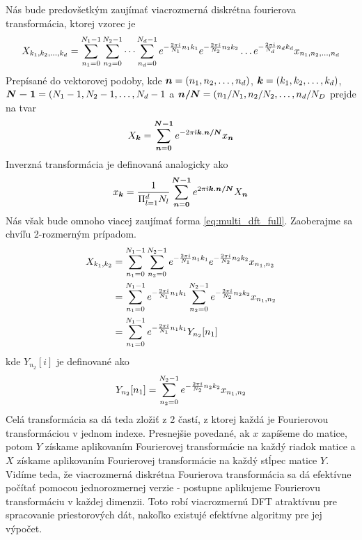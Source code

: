 Nás bude predovšetkým zaujímať viacrozmerná diskrétna fourierova
transformácia, ktorej vzorec je
\begin{equation}
    X_{k_1,k_2,\dots,k_d} = \sum_{n_1=0}^{N_1-1}
        \sum_{n_2=0}^{N_2-1} \dots \sum_{n_d=0}^{N_d-1}
        e^{-\frac{2\pi\hat{\imath}}{N_1} n_1 k_1}
        e^{-\frac{2\pi\hat{\imath}}{N_2} n_2 k_2} \dots
        e^{-\frac{2\pi\hat{\imath}}{N_d} n_d k_d}
        x_{n_1,n_2,\dots,n_d}
    \label{eq:multi_dft_full}
\end{equation}
Prepísané do vektorovej podoby, kde $\boldsymbol{n}=(n_1,n_2,\dots,n_d)$,
$\boldsymbol{k}=(k_1,k_2,\dots,k_d)$,
$\boldsymbol{N-1}=(N_1-1,N_2-1,\dots,N_d-1$ a $\boldsymbol{n/N}=(n_1/N_1,
n_2/N_2, \dots, n_d/N_D$ prejde na tvar
\begin{equation*}
    X_{\boldsymbol{k}} = \sum_{\boldsymbol{n}=\boldsymbol{0}}^{\boldsymbol{N-1}}
      e^{-2\pi\hat{\imath} \boldsymbol{k}.\boldsymbol{n/N}} x_{\boldsymbol{n}}
\end{equation*}
Inverzná transformácia je definovaná analogicky ako
\begin{equation*}
    x_{\boldsymbol{k}} = \frac{1}{\Pi_{l=1}^{d} N_l} 
            \sum_{\boldsymbol{n}=\boldsymbol{0}}^{\boldsymbol{N-1}}
                e^{2\pi\hat{\imath} \boldsymbol{k}.\boldsymbol{n/N}} X_{\boldsymbol{n}}
\end{equation*}
Nás však bude omnoho viacej zaujímať forma \eqref{eq:multi_dft_full}.
Zaoberajme sa chvíľu 2-rozmerným prípadom.
\begin{equation*}
    \begin{split}
    X_{k_1,k_2} &=
        \sum_{n_1=0}^{N_1-1}
        \sum_{n_2=0}^{N_2-1} 
        e^{-\frac{2\pi\hat{\imath}}{N_1} n_1 k_1}
        e^{-\frac{2\pi\hat{\imath}}{N_2} n_2 k_2} 
        x_{n_1,n_2} \\&=
        \sum_{n_1=0}^{N_1-1}
        e^{-\frac{2\pi\hat{\imath}}{N_1} n_1 k_1}
        \sum_{n_2=0}^{N_2-1} 
        e^{-\frac{2\pi\hat{\imath}}{N_2} n_2 k_2} 
        x_{n_1,n_2} \\&=
        \sum_{n_1=0}^{N_1-1}
        e^{-\frac{2\pi\hat{\imath}}{N_1} n_1 k_1}
          Y_{n_2}[n_1]
    \end{split}
\end{equation*}
kde $Y_{n_2}[i]$ je definované ako
\begin{equation*}
    Y_{n_2}[n_1]=
        \sum_{n_2=0}^{N_2-1} e^{-\frac{2\pi\hat{\imath}}{N_2} n_2 k_2} x_{n_1,n_2}
\end{equation*}
Celá transformácia sa dá teda zložiť z 2 častí, z ktorej každá je
Fourierovou transformáciou v jednom indexe. Presnejšie povedané, ak
$x$ zapíšeme do matice, potom $Y$ získame aplikovaním Fourierovej
transformácie na každý riadok matice a $X$ získame aplikovaním
Fourierovej transformácie na každý stĺpec matice $Y$.
Vidíme teda, že viacrozmerná diskrétna Fourierova transformácia sa dá
efektívne počítať pomocou jednorozmernej verzie - postupne aplikujeme
Fourierovu transformáciu v každej dimenzii. Toto robí viacrozmernú DFT
atraktívnu pre spracovanie priestorových dát, nakoľko existujé
efektívne algoritmy pre jej výpočet.
